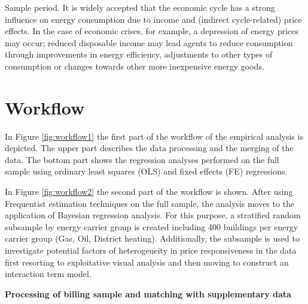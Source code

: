 \documentclass[12pt,twoside]{reedthesis}
\begin{document}
Sample period. It is widely accepted that the economic cycle has a strong influence on energy consumption due to income and (indirect cycle-related) price effects. In the case of economic crises, for example, a depression of energy prices may occur; reduced disposable income may lead agents to reduce consumption through improvements in energy efficiency, adjustments to other types of consumption or changes towards other more inexpensive energy goods.

\hypertarget{workflow}{%
\section{Workflow}\label{workflow}}

In Figure \ref{fig:workflow1} the first part of the workflow of the empirical analysis is depicted. The upper part describes the data processing and the merging of the data. The bottom part shows the regression analyses performed on the full sample using ordinary least squares (OLS) and fixed effects (FE) regressions.

In Figure \ref{fig:workflow2} the second part of the workflow is shown. After using Frequentist estimation techniques on the full sample, the analysis moves to the application of Bayesian regression analysis. For this purpose, a stratified random subsample by energy carrier group is created including 400 buildings per energy carrier group (Gas, Oil, District heating). Additionally, the subsample is used to investigate potential factors of heterogeneity in price responsiveness in the data first resorting to exploitative visual analysis and then moving to construct an interaction term model.

\textbf{Processing of billing sample and matching with supplementary data}
\end{document}
